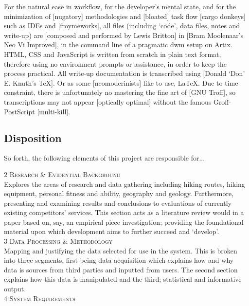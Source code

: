 \documentclass[11pt, english]{article}
\begin{document}
	For the natural ease in workflow, for the developer's mental state, and for the minimization of [nugatory] methodologies and [bloated] task flow [cargo donkeys] such as IDEs and [froymeworks], all files (including `code', data files, notes and write-up) are [composed and performed by Lewis Britton] in [Bram Moolenaar's Neo Vi Improved], in the command line of a pragmatic dwm setup on Artix. HTML, CSS and JavaScript is written from scratch in plain text format, therefore using no environment prompts or assistance, in order to keep the process practical. All write-up documentation is transcribed using [Donald `Don' E. Knuth's \TeX]. Or as some [neomoderinists] like to use, \LaTeX. Due to time constraint, there is unfortunately no mastering the fine art of [GNU Troff], so transcriptions may not appear [optically optimal] without the famous Groff-PostScript [multi-kill].

	\subsection{Disposition}

	So forth, the following elements of this project are responsible for...

	\textsc{2 Research \& Evidential Background}\\

	Explores the areas of research and data gathering including hiking routes, hiking equipment, personal fitness and ability, geography and geology. Furthermore, presenting and examining results and conclusions to evaluations of currently existing competitors' services. This section acts as a literature review would in a paper based on, say, an empirical piece investigation; providing the foundational material upon which development aims to further succeed and `develop'.\\

	\textsc{3 Data Processing \& Methodology}\\
	
	Mapping and justifying the data selected for use in the system. This is broken into three segments, first being data acquisition which explains how and why data is sources from third parties and inputted from users. The second section explains how this data is manipulated and the third; statistical and informative output.\\

	\textsc{4 System Requirements}\\
	
\end{document}
